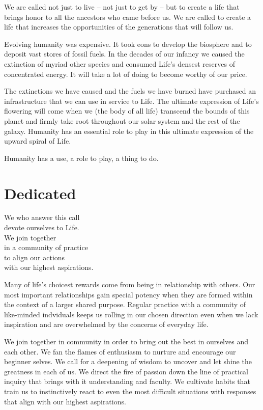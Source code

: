 \documentclass[ebook,12pt,openany,twoside]{memoir}
\newcommand{\tab}{\hspace*{2em}}
\newcommand{\imagefacingchapter}[1]{
  \cleartoverso
  \clearpage \null
  \thispagestyle{cleared}
  \AddToShipoutPictureBG*{%
    \AtStockLowerLeft{%
      \texttt{[image: \#1]}
    }
  }
  \clearpage
}
\begin{document}
We are called not just to live -- not just to get by -- but to create a life
that brings honor to all the ancestors who came before us. We are called to
create a life that increases the opportunities of the generations that will
follow us.

Evolving humanity was expensive. It took eons to develop the biosphere and to
deposit vast stores of fossil fuels. In the decades of our infancy we caused
the extinction of myriad other species and consumed Life's densest reserves of
concentrated energy. It will take a lot of doing to become worthy of our price.


The extinctions we have caused and the fuels we have burned have purchased an
infrastructure that we can use in service to Life. The ultimate expression of
Life's flowering will come when we (the body of all life) transcend the bounds
of this planet and firmly take root throughout our solar system and the rest of
the galaxy. Humanity has an essential role to play in this ultimate expression
of the upward spiral of Life.

Humanity has a use, a role to play, a thing to do.




\imagefacingchapter{images/Dedicated}
\chapter{Dedicated}
\setlength\epigraphwidth{3.0in}
\epigraph{
  We who answer this call\\
  devote ourselves to Life.\\
  \tab We join together\\
  \tab in a community of practice\\
  \tab to align our actions\\
  \tab with our highest aspirations.
}{}

\noindent Many of life's choicest rewards come from being in relationship with
others. Our most important relationships gain special potency when they are
formed within the context of a larger shared purpose. Regular practice with a
community of like-minded indviduals keeps us rolling in our chosen direction
even when we lack inspiration and are overwhelmed by the concerns of everyday
life.

We join together in community in order to bring out the best in ourselves and
each other. We fan the flames of enthusiasm to nurture and encourage our
beginner selves. We call for a deepening of wisdom to uncover and let shine the
greatness in each of us. We direct the fire of passion down the line of
practical inquiry that brings with it understanding and faculty. We cultivate
habits that train us to instinctively react to even the most difficult
situations with responses that align with our highest aspirations.
\end{document}
